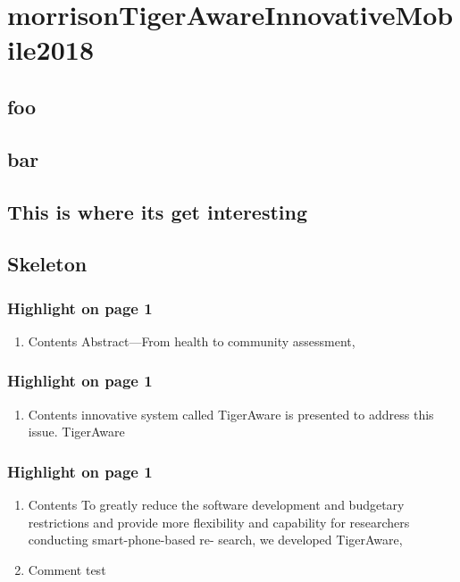\documentclass[11pt]{article}
\author{Reyva Babtista}
\date{\today}
\title{}
\begin{document}
\tableofcontents

\section{morrisonTigerAwareInnovativeMobile2018}
\label{sec:org5357e54}
\subsection{foo}
\label{sec:org25b281b}
\subsection{bar}
\label{sec:org76aee0d}
\subsection{This is where its get interesting}
\label{sec:orgd3bfccb}
\subsection{Skeleton}
\label{sec:org10cd59b}
\subsubsection{Highlight on page 1}
\label{sec:orgaf0003a}
\begin{enumerate}
\item Contents
\label{sec:orgb3aeeb1}
Abstract—From health to community assessment,
\end{enumerate}
\subsubsection{Highlight on page 1}
\label{sec:org448400c}
\begin{enumerate}
\item Contents
\label{sec:orgef2a2e9}
innovative system called TigerAware is presented
to address this issue. TigerAware
\end{enumerate}
\subsubsection{Highlight on page 1}
\label{sec:orgb9cc7d4}
\begin{enumerate}
\item Contents
\label{sec:org7f76ac7}
To greatly reduce the software development
and budgetary restrictions and provide more ﬂexibility and
capability for researchers conducting smart-phone-based re-
search, we developed TigerAware,
\item Comment
\label{sec:orgc939f88}
test
\end{enumerate}
\end{document}
